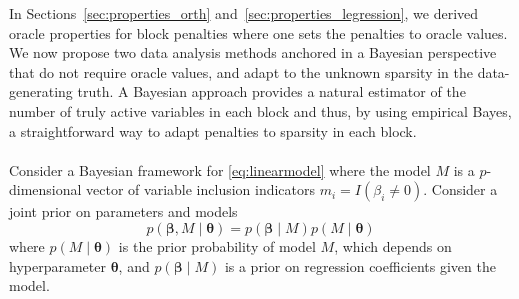 \documentclass[aos]{imsart}
\theoremstyle{plain}
\newcommand{\bs}{\boldsymbol}
\begin{document}
In Sections~\ref{sec:properties_orth} and~\ref{sec:properties_legression}, we derived oracle properties for block penalties where one sets the penalties to oracle values.
We now %
propose two data analysis methods anchored in a Bayesian perspective %
that do not require oracle values, and adapt to the unknown sparsity in the data-generating truth.
A Bayesian approach provides a natural estimator of the number of truly active variables in each block and thus, by using empirical Bayes, a straightforward way to adapt penalties to sparsity in each block. %
\\
\\
Consider a Bayesian framework for \eqref{eq:linearmodel} where %
the model $M$ is a $p$-dimensional vector of variable inclusion indicators $m_i=I(\beta_i \neq 0)$. Consider a joint prior on parameters and models 
\begin{equation}\label{eq:bayesianframework}
    p(\boldsymbol{\beta},M \mid \boldsymbol{\theta})=p( \boldsymbol{\beta} \mid  M) p(M \mid \boldsymbol{\theta})
\end{equation}
where $p(M \mid \boldsymbol{\theta})$ is the prior probability of model $M$, which depends on hyperparameter $\bs \theta$,
and $p( \boldsymbol{\beta} \mid  M)$ is a prior on regression coefficients given the model. 
\end{document}
